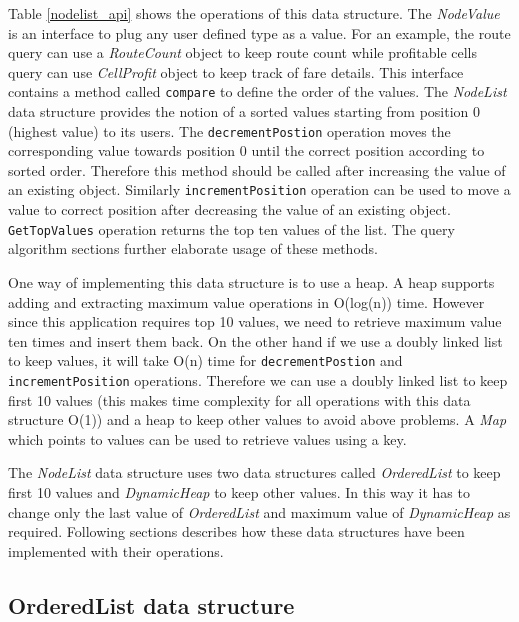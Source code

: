 Table \ref{nodelist_api} shows the operations of this data structure. The \textit{NodeValue} is an interface to plug any user defined type as a value. For an example, the route query can use a \textit{RouteCount} object to keep route count while profitable cells query can use \textit{CellProfit} object to keep track of fare details. This interface contains a method called \texttt{compare} to define the order of the values. The \textit{NodeList} data structure provides the notion of a sorted values starting from position 0 (highest value) to its users. The \texttt{decrementPostion} operation moves the corresponding value towards position 0 until the correct position according to sorted order. Therefore this method should be called after increasing the value of an existing object. Similarly \texttt{incrementPosition} operation can be used to move a value to correct position after decreasing the value of an existing object. \texttt{GetTopValues} operation returns the top ten values of the list. The query algorithm sections further elaborate usage of these methods.

One way of implementing this data structure is to use a heap. A heap supports adding and extracting maximum value operations in O(log(n)) time. However since this application requires top 10 values, we need to retrieve maximum value ten times and insert them back. On the other hand if we use a doubly linked list to keep values, it will take O(n) time for  \texttt{decrementPostion} and \texttt{incrementPosition} operations. Therefore we can use a doubly linked list to keep first 10 values (this makes time complexity for all operations with this data structure O(1)) and a heap to keep other values to avoid above problems.  A \textit{Map} which points to values can be used to retrieve values using a key.

The \textit{NodeList} data structure uses two data structures called \textit{OrderedList} to keep first 10 values and \textit{DynamicHeap} to keep other values. In this way it has to change only the last value of \textit{OrderedList} and maximum value of \textit{DynamicHeap} as required. Following sections describes how these data structures have been implemented with their operations.

\subsection{OrderedList data structure}

